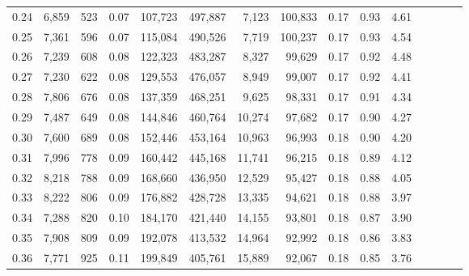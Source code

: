 \begin{tabular}{rrrcrrrrrrrrrrr}
0.24 &   6,859 &    523 &                                       0.07 &  107,723 &  497,887 &    7,123 &  100,833 &  0.17 &  0.93 &                         4.61 \\
0.25 &   7,361 &    596 &                                       0.07 &  115,084 &  490,526 &    7,719 &  100,237 &  0.17 &  0.93 &                         4.54 \\
0.26 &   7,239 &    608 &                                       0.08 &  122,323 &  483,287 &    8,327 &   99,629 &  0.17 &  0.92 &                         4.48 \\
0.27 &   7,230 &    622 &                                       0.08 &  129,553 &  476,057 &    8,949 &   99,007 &  0.17 &  0.92 &                         4.41 \\
0.28 &   7,806 &    676 &                                       0.08 &  137,359 &  468,251 &    9,625 &   98,331 &  0.17 &  0.91 &                         4.34 \\
0.29 &   7,487 &    649 &                                       0.08 &  144,846 &  460,764 &   10,274 &   97,682 &  0.17 &  0.90 &                         4.27 \\
0.30 &   7,600 &    689 &                                       0.08 &  152,446 &  453,164 &   10,963 &   96,993 &  0.18 &  0.90 &                         4.20 \\
0.31 &   7,996 &    778 &                                       0.09 &  160,442 &  445,168 &   11,741 &   96,215 &  0.18 &  0.89 &                         4.12 \\
0.32 &   8,218 &    788 &                                       0.09 &  168,660 &  436,950 &   12,529 &   95,427 &  0.18 &  0.88 &                         4.05 \\
0.33 &   8,222 &    806 &                                       0.09 &  176,882 &  428,728 &   13,335 &   94,621 &  0.18 &  0.88 &                         3.97 \\
0.34 &   7,288 &    820 &                                       0.10 &  184,170 &  421,440 &   14,155 &   93,801 &  0.18 &  0.87 &                         3.90 \\
0.35 &   7,908 &    809 &                                       0.09 &  192,078 &  413,532 &   14,964 &   92,992 &  0.18 &  0.86 &                         3.83 \\
0.36 &   7,771 &    925 &                                       0.11 &  199,849 &  405,761 &   15,889 &   92,067 &  0.18 &  0.85 &                         3.76 \\

\end{tabular}
